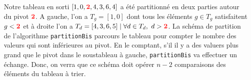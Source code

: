\documentclass[10pt]{article} %
\newcommand{\asred}[1]{\textcolor{red}{{\bf#1}}}
\begin{document}
\vspace{0.2cm}
Notre tableau en sorti $[1, 0, \asred{2}, 4, 3, 6, 4]$ a été partitionné en deux parties autour du pivot $\asred{2}$. A gauche, l'on a $T_g = [1, 0]$ dont tous
les éléments $g \in T_g$ satisfaitent $g < \asred{2}$ et à droite l'on a $T_d = [4, 3, 6, 5] \mid \forall d \in T_d,\ d > \asred{2}$. La schéma de partition de
l'algorithme \texttt{partitionBis} parcours le tableau pour compter le nombre des valeurs qui sont inférieures au pivot. En le comptant, s'il il y a des
valuers plus grand que le pivot dans le soustableau à gauche, \texttt{partitionBis} va effectuer un échange. Donc, on verra que ce schéma doit opérer $n - 2$ comparaisons
des éléments du tableau à trier.

\newpage

\pagestyle{fancy}
\end{document}
